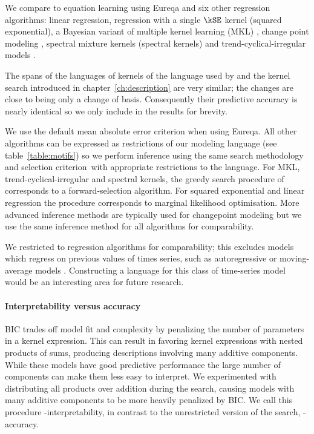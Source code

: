 We compare \procedurename{} to equation learning using Eureqa \citep{Nutonian2011-el} and six other regression algorithms: linear regression, \gp{} regression with a single $\kSE$ kernel (squared exponential), a Bayesian variant of multiple kernel learning (MKL) \citep[e.g.][]{Bach2004-lb}, change point modeling \citep[e.g.][]{Garnett2010-rd, Saatci2010-el, Fox2012-fm}, spectral mixture kernels \citep{Wilson2013-eq} (spectral kernels) and trend-cyclical-irregular models \citep[e.g.][]{Lind2006-th}.

The spans of the languages of kernels of the language used by \procedurename{} and the kernel search introduced in chapter~\ref{ch:description} are very similar; the changes are close to being only a change of basis.
Consequently their predictive accuracy is nearly identical so we only include \procedurename{} in the results for brevity.

We use the default mean absolute error criterion when using Eureqa.
All other algorithms can be expressed as restrictions of our modeling language (see table~\ref{table:motifs}) so we perform inference using the same search methodology and selection criterion\footnotemark~with appropriate restrictions to the language.
For MKL, trend-cyclical-irregular and spectral kernels, the greedy search procedure of \procedurename{} corresponds to a forward-selection algorithm.
For squared exponential and linear regression the procedure corresponds to marginal likelihood optimisation.
More advanced inference methods are typically used for changepoint modeling but we use the same inference method for all algorithms for comparability.

We restricted to regression algorithms for comparability; this excludes models which regress on previous values of times series, such as autoregressive or moving-average models \citep[e.g.][]{Box1976-qk}.
Constructing a language for this class of time-series model would be an interesting area for future research.

\paragraph{Interpretability versus accuracy}

BIC trades off model fit and complexity by penalizing the number of parameters in a kernel expression.
This can result in \procedurename{} favoring kernel expressions with nested products of sums, producing descriptions involving many additive components.
While these models have good predictive performance the large number of components can make them less easy to interpret.
We experimented with distributing all products over addition during the search, causing models with many additive components to be more heavily penalized by BIC.
We call this procedure \procedurename{}-interpretability, in contrast to the unrestricted version of the search, \procedurename{}-accuracy.

